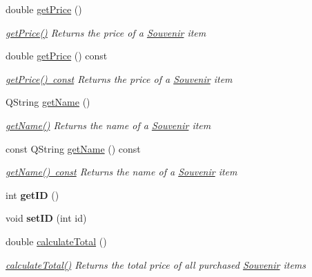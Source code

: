 \begin{DoxyCompactItemize}
double \mbox{\hyperlink{class_souvenir_a1cb4a0a435a8343fb4a6519e534e6a69}{get\+Price}} ()
\begin{DoxyCompactList}\small\item\em \mbox{\hyperlink{class_souvenir_a1cb4a0a435a8343fb4a6519e534e6a69}{get\+Price()}} Returns the price of a \mbox{\hyperlink{class_souvenir}{Souvenir}} item \end{DoxyCompactList}\item 
double \mbox{\hyperlink{class_souvenir_aa3dfe5b64bfc5e3785cefd90759e281f}{get\+Price}} () const
\begin{DoxyCompactList}\small\item\em \mbox{\hyperlink{class_souvenir_aa3dfe5b64bfc5e3785cefd90759e281f}{get\+Price() const}} Returns the price of a \mbox{\hyperlink{class_souvenir}{Souvenir}} item \end{DoxyCompactList}\item 
Q\+String \mbox{\hyperlink{class_souvenir_acdfe838ebcf9839c888d872ca6a75782}{get\+Name}} ()
\begin{DoxyCompactList}\small\item\em \mbox{\hyperlink{class_souvenir_acdfe838ebcf9839c888d872ca6a75782}{get\+Name()}} Returns the name of a \mbox{\hyperlink{class_souvenir}{Souvenir}} item \end{DoxyCompactList}\item 
const Q\+String \mbox{\hyperlink{class_souvenir_a9217ac954224c2c44df986cff868b90f}{get\+Name}} () const
\begin{DoxyCompactList}\small\item\em \mbox{\hyperlink{class_souvenir_a9217ac954224c2c44df986cff868b90f}{get\+Name() const}} Returns the name of a \mbox{\hyperlink{class_souvenir}{Souvenir}} item \end{DoxyCompactList}\item 
\mbox{\label{class_souvenir_a0b7e1553cb3e11a74a23af6165b352a1}} 
int {\bfseries get\+ID} ()
\item 
\mbox{\label{class_souvenir_a9541a7b12fb73992067dff61f40f43c2}} 
void {\bfseries set\+ID} (int id)
\item 
double \mbox{\hyperlink{class_souvenir_a4ee8f8262e9020e6141c4d228450b03d}{calculate\+Total}} ()
\begin{DoxyCompactList}\small\item\em \mbox{\hyperlink{class_souvenir_a4ee8f8262e9020e6141c4d228450b03d}{calculate\+Total()}} Returns the total price of all purchased \mbox{\hyperlink{class_souvenir}{Souvenir}} items \end{DoxyCompactList}\item 

\end{DoxyCompactItemize}
